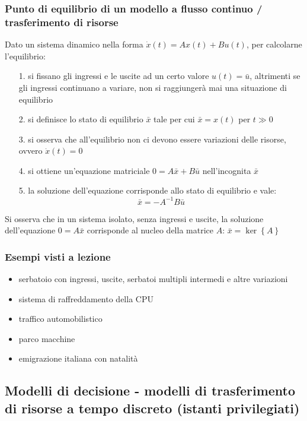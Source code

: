 \subsubsection*{Punto di equilibrio di un modello a flusso continuo / trasferimento di risorse}
Dato un sistema dinamico nella forma \(\dot{x}(t) = Ax(t) + Bu(t)\), per calcolarne l'equilibrio:
\begin{itemize}
	\item[1.] si fissano gli ingressi e le uscite ad un certo valore \(u(t) = \bar{u}\), altrimenti se gli ingressi continuano
	a variare, non si raggiungerà mai una situazione di equilibrio
	\item[2.] si definisce lo stato di equilibrio \(\bar{x}\) tale per cui \(\bar{x} = x(t)\) per \(t \gg 0\)
	\item[3.] si osserva che all'equilibrio non ci devono essere variazioni delle risorse, ovvero \(\dot{x}(t) = 0\)
	\item[4.] si ottiene un'equazione matriciale \(0 = A \bar{x} + B \bar{u}\) nell'incognita \(\bar{x}\)
	\item[5.] la soluzione dell'equazione corrisponde allo stato di equilibrio e vale: \[\bar{x} = -A^{-1}B \bar{u}\]
\end{itemize}
Si osserva che in un sistema isolato, senza ingressi e uscite, la soluzione dell'equazione \(0 = A \bar{x}\) corrisponde al
nucleo della matrice \(A\): \(\bar{x} = \ker \left\{A\right\}\)


\subsubsection*{Esempi visti a lezione}
\begin{itemize}
	\item serbatoio con ingressi, uscite, serbatoi multipli intermedi e altre variazioni
	\item sistema di raffreddamento della CPU
	\item traffico automobilistico
	\item parco macchine
	\item emigrazione italiana con natalità
\end{itemize}

\newpage

\subsection{Modelli di decisione - modelli di trasferimento di risorse a tempo discreto (istanti privilegiati)}
